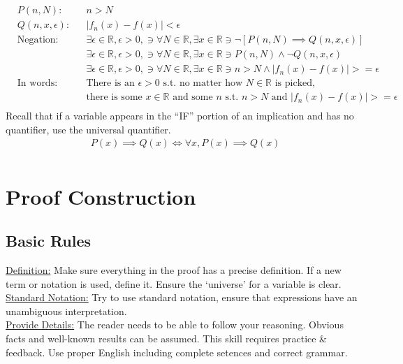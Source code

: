 \documentclass{article}
\begin{document}
\begin{itemize}
\begin{align*}
		& P(n, N): && n > N \\
		& Q(n ,x, \epsilon): && |f_n(x) - f(x)| < \epsilon\\
		& \text{Negation:} && \exists \epsilon \in \mathbb{R}, \epsilon > 0, \ni \forall N \in \mathbb{R}, \exists x \in \mathbb{R} \ni \neg[P(n,N) \implies Q(n, x, \epsilon)]\\
		& && \exists \epsilon \in \mathbb{R}, \epsilon > 0, \ni \forall N \in \mathbb{R}, \exists x \in \mathbb{R} \ni P(n,N) \wedge \neg Q(n, x, \epsilon)\\
		& && \exists \epsilon \in \mathbb{R}, \epsilon > 0, \ni \forall N \in \mathbb{R}, \exists x \in \mathbb{R} \ni n > N \wedge |f_n(x) - f(x)| >= \epsilon \\
		& \text{In words:} && \text{There is an $\epsilon > 0$ s.t. no matter how $N \in \mathbb{R}$ is picked,}\\
		& && \text{there is some $x \in \mathbb{R}$ and some $n$ s.t. $n > N$ and $|f_n(x) - f(x)| >= \epsilon$} \\
	\end{align*}
	Recall that if a variable appears in the ``IF'' portion of an implication and has no quantifier, use the universal quantifier.
	\begin{align*}
		& P(x) \implies Q(x) \iff \forall x, P(x) \implies Q(x) \\
	\end{align*}
\end{itemize}

\section{Proof Construction}
\subsection{Basic Rules}
\underline{Definition:} Make sure everything in the proof has a precise definition. If a new term or notation is used, define it. Ensure the `universe' for a variable is clear.\\
\underline{Standard Notation:} Try to use standard notation, ensure that expressions have an unambiguous interpretation.\\
\underline{Provide Details:} The reader needs to be able to follow your reasoning. Obvious facts and well-known results can be assumed. This skill requires practice \& feedback. Use proper English including complete setences and correct grammar.
\end{document}
